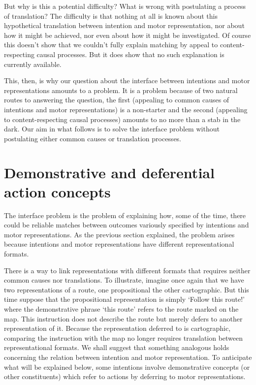 \documentclass[12pt,\papersize]{extarticle}
\begin{document}
But why is this a potential difficulty? What is wrong with postulating a process of translation? The difficulty is that nothing at all is known about this hypothetical translation between intention and motor representation, nor about how it might be achieved, nor even about how it might be investigated. Of course this doesn't show that we couldn't fully explain matching by appeal to content-respecting causal processes. But it does show that no such explanation is currently available.  

This, then, is why our question about the interface between intentions and motor representations amounts to a problem. It is a problem because of two natural routes to answering the question, the first (appealing to common causes of intentions and motor representations) is a non-starter and the second (appealing to content-respecting causal processes) amounts to no more than a stab in the dark.  Our aim in what follows is to solve the interface problem without postulating either common causes or translation processes.



\section{Demonstrative and deferential action concepts}

The interface problem is the problem of explaining how, some of the time, there could be reliable matches between outcomes variously specified by intentions and motor representations. As the previous section explained, the problem arises because intentions and motor representations have different representational formats.

There is a way to link representations with different formats that requires neither common causes nor translations. To illustrate, imagine once again that we have two representations of a route, one propositional the other cartographic. But this time suppose that the propositional representation is simply `Follow this route!' where the demonstrative phrase `this route' refers to the route marked on the map. This instruction does not describe the route but merely defers to another representation of it. Because the representation deferred to is cartographic, comparing the instruction with the map no longer requires translation between representational formats. We shall suggest that something analogous holds concerning the relation between intention and motor representation. To anticipate what will be explained below, some intentions involve demonstrative concepts (or other constituents) which refer to actions by deferring to motor representations.
\end{document}
